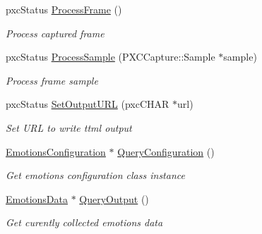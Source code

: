 \begin{DoxyCompactItemize}
\mbox{\label{class_emotions_tracker_a80001215d863892367d69fe4325fb41b}} 
pxc\+Status \hyperlink{class_emotions_tracker_a80001215d863892367d69fe4325fb41b}{Process\+Frame} ()
\begin{DoxyCompactList}\small\item\em Process captured frame \end{DoxyCompactList}\item 
pxc\+Status \hyperlink{class_emotions_tracker_ae0ab90b095ae541d2129b0d470f7d7ff}{Process\+Sample} (P\+X\+C\+Capture\+::\+Sample $\ast$sample)
\begin{DoxyCompactList}\small\item\em Process frame sample \end{DoxyCompactList}\item 
\mbox{\label{class_emotions_tracker_a7a83b4e6d753fd13d541afde8d550783}} 
pxc\+Status \hyperlink{class_emotions_tracker_a7a83b4e6d753fd13d541afde8d550783}{Set\+Output\+U\+RL} (pxc\+C\+H\+AR $\ast$url)
\begin{DoxyCompactList}\small\item\em Set U\+RL to write ttml output \end{DoxyCompactList}\item 
\mbox{\label{class_emotions_tracker_a0ce7070b0331662358fcefde44b22441}} 
\hyperlink{class_emotions_configuration}{Emotions\+Configuration} $\ast$ \hyperlink{class_emotions_tracker_a0ce7070b0331662358fcefde44b22441}{Query\+Configuration} ()
\begin{DoxyCompactList}\small\item\em Get emotions configuration class instance \end{DoxyCompactList}\item 
\mbox{\label{class_emotions_tracker_a097d4ff8db0b4ca330bec36e2343ff73}} 
\hyperlink{class_emotions_data}{Emotions\+Data} $\ast$ \hyperlink{class_emotions_tracker_a097d4ff8db0b4ca330bec36e2343ff73}{Query\+Output} ()
\begin{DoxyCompactList}\small\item\em Get curently collected emotions data \end{DoxyCompactList}\item 
\mbox{\label{class_emotions_tracker_a054e0ccebc638d54b6deb1ec60f660e3}} 

\end{DoxyCompactItemize}
